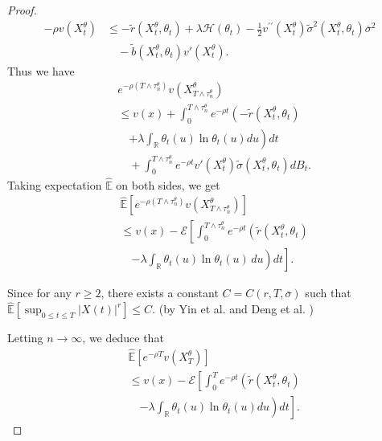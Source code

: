 \documentclass[onecolumn, journal]{IEEEtran} %
\begin{document}
\begin{proof}
		\[
		\begin{aligned}
			-\rho v(X_{t}^{\theta}) 
			&\leq -\tilde{r}(X_{t}^{\theta}, \theta_t) + \lambda \mathcal{H}(\theta_t)  - \frac{1}{2}v^{\prime\prime}(X_{t}^{\theta})\tilde{\sigma}^{2}(X_{t}^{\theta},\theta_{t})\overline{\sigma}^2\\
			&\quad - \tilde{b}(X_{t}^{\theta}, \theta_t) v'(X_{t}^{\theta}).
		\end{aligned}
		\]
		Thus we have
		\begin{align*}
			&e^{-\rho(T\wedge\tau_{n}^{\theta})}v(X_{T\wedge\tau_{n}^{\theta}}^{\theta}) \\
			&\leq v(x) + \int_{0}^{T\wedge\tau_{n}^{\theta}} e^{-\rho t} \left(-\tilde{r}(X_t^\theta, \theta_t) \right. \\
			&\quad \left. + \lambda \int_{\mathbb{R}} \theta_t(u) \ln \theta_t(u) du\right) dt \\
			&\quad + \int_0^{T\wedge\tau_n^\theta} e^{-\rho t}v'(X_t^\theta)\tilde{\sigma}(X_t^\theta,\theta_t) dB_t.
		\end{align*}
		Taking expectation $\hat{\mathbb{E}}$ on both sides, we get
		\[
		\begin{aligned}
			&\hat{\mathbb{E}}\left[e^{-\rho(T \wedge \tau_n^\theta)} v(X_{T \wedge \tau_n^\theta}^\theta)\right] \\
			& \leq v(x) -\mathcal{E}\left[\int_{0}^{T \wedge \tau_n^\theta} e^{-\rho t} \left(\tilde{r}(X_t^\theta, \theta_t) \right. \right. \\
			&\quad \left. \left. - \lambda \int_{\mathbb{R}} \theta_t(u) \ln \theta_t(u) \, du \right) dt \right].
		\end{aligned}
		\]
		
		Since for any \( r \geq 2 \), there exists a constant \( C = C(r, T, \overline{\sigma}) \) such that
		$
		\hat{\mathbb{E}}\left[ \sup_{0 \leq t \leq T} |X(t)|^r \right] \leq C.
		$ (by Yin et al. \cite{yin2019quasi} and Deng et al. \cite{deng2025convergence})
		
		Letting $n \to \infty$, we deduce that
		\[
		\begin{aligned}
			&\hat{\mathbb{E}} \left[ e^{-\rho T} v(X_T^\theta) \right]\\
			& \leq v(x) - \mathcal{E}\left[\int_0^T e^{-\rho t} \left(\tilde{r}(X_t^\theta, \theta_t) \right.\right. \\
			&\quad \left.\left. - \lambda \int_{\mathbb{R}} \theta_t(u) \ln \theta_t(u) du\right) dt\right].
		\end{aligned}
		\]
		

\end{proof}
\end{document}
